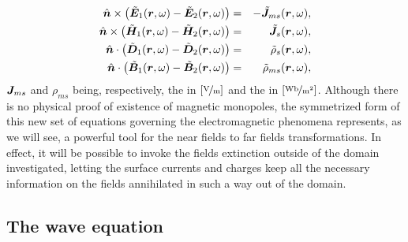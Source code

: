 \begin{eqnarray}
\hat{\mbfit{n}} \times \left (\tilde{\mbfit{E}}_1(\mbfit{r},\omega)-\tilde{\mbfit{E}}_2(\mbfit{r},\omega) \right ) &= & - \tilde{\mbfit{J}}_{ms}(\mbfit{r},\omega), \\ \label{eq:conte}
\hat{\mbfit{n}} \times \left (\tilde{\mbfit{H}}_1(\mbfit{r},\omega)-\tilde{\mbfit{H}}_2(\mbfit{r},\omega) \right )&= & \tilde{\mbfit{J}}_s(\mbfit{r},\omega), \\ \label{eq:conth}
\hat{\mbfit{n}} \cdot \left (\tilde{\mbfit{D}}_1(\mbfit{r},\omega)-\tilde{\mbfit{D}}_2(\mbfit{r},\omega) \right ) &= & \tilde{\rho}_s(\mbfit{r},\omega), \\ \label{eq:contd}
\hat{\mbfit{n}} \cdot \left (\tilde{\mbfit{B}}_1(\mbfit{r},\omega)-\tilde{\mbfit{B}}_2(\mbfit{r},\omega) \right ) &= & {\tilde{\rho}}_{ms}(\mbfit{r},\omega), \label{eq:contb}
\end{eqnarray} $\mbfit{J}_{ms}$ and $\rho_{ms}$ being, respectively, the  in $\mathrm{[\nicefrac{\mathrm{V}}{m}]}$ and the  in $\mathrm{[\nicefrac{\mathrm{Wb}}{m^2}]}$.
Although there is no physical proof of existence of magnetic monopoles, the symmetrized form of this new set of equations governing the electromagnetic phenomena represents, as we will see, a powerful tool for the near fields to far fields transformations. In effect, it will be possible to invoke the fields extinction outside of the domain investigated, letting the surface currents and charges keep all the necessary information on the fields annihilated in such a way out of the domain.

\subsection{The wave equation} %

